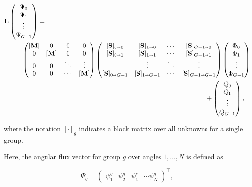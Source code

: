 \begin{align}
    \ve{L}
    &\begin{pmatrix}
      \Psi_0 \\
      \Psi_1 \\
      \vdots   \\
      \Psi_{G-1}  \nonumber
    \end{pmatrix} = \\
    &\qquad\begin{pmatrix}
      [\ve{M}] & 0 & 0 & 0 \\
      0 & [\ve{M}] & 0 & 0 \\
      0 & 0 & \ddots & \vdots \\
      0 & 0 & \cdots & [\ve{M}] \\
    \end{pmatrix}
    \begin{pmatrix}
      [\ve{S}]_{0\sa0} & [\ve{S}]_{1\sa0} & \cdots & [\ve{S}]_{G-1\sa0} \\
      [\ve{S}]_{0\sa1} & [\ve{S}]_{1\sa1} & \cdots & [\ve{S}]_{G-1\sa1} \\
      \vdots & \vdots & \ddots & \vdots \\
      [\ve{S}]_{0\sa G-1} & [\ve{S}]_{1\sa G-1} & \cdots & [\ve{S}]_{G-1\sa G-1}
    \end{pmatrix}
    \begin{pmatrix}
      \Phi_0 \\
      \Phi_1 \\
      \vdots   \\
      \Phi_{G-1}
    \end{pmatrix}
    \\&\fq\fq\fq\qquad\qquad\qquad+
    \begin{pmatrix}
      Q_0 \\
      Q_1 \\
      \vdots  \\
      Q_{G-1}
    \end{pmatrix}, \nonumber
    \label{eq:matrix-transport}
\end{align}

\noindent where the notation $[\cdot]_g$ indicates a block matrix over all
unknowns for a single group.  

Here, the angular flux vector for group $g$ over angles $1,\ldots,N$ is defined as

\begin{equation}
  \Psi_g = \begin{pmatrix}
    \psi^g_1 & \psi^g_2 & \psi^g_3 & \cdots \psi^g_N
  \end{pmatrix}^\top,
\label{psiv}
\end{equation}

